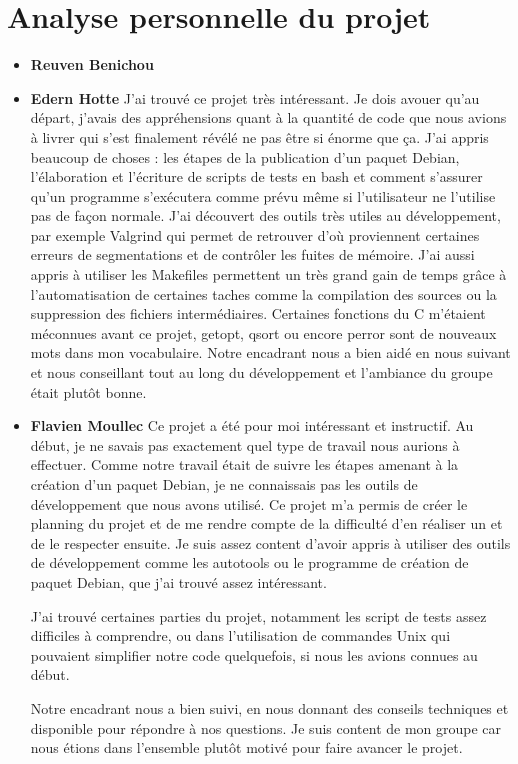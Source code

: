 \chapter{Analyse personnelle du projet}

\begin{itemize}
\item [\textbullet] \Large \textbf{Reuven Benichou}
\newline
\normalsize
\item [\textbullet] \Large \textbf{Edern Hotte}
\newline
\normalsize
J'ai trouv\'e ce projet tr\`es int\'eressant. Je dois avouer qu'au d\'epart, j'avais des appr\'ehensions quant \`a la quantit\'e de code que nous avions \`a livrer qui s'est finalement 
r\'ev\'el\'e ne pas \^etre si \'enorme que \c ca. J'ai appris beaucoup de choses : les \'etapes de la publication d'un paquet Debian, l'\'elaboration et l'\'ecriture de scripts de tests 
en bash et comment s'assurer qu'un programme s'ex\'ecutera comme pr\'evu m\^eme si l'utilisateur ne l'utilise pas de fa\c con normale. J'ai d\'ecouvert des outils tr\`es utiles au d\'eveloppement, par exemple Valgrind qui permet de retrouver
d'o\`u proviennent certaines erreurs de segmentations et de contr\^oler les fuites de m\'emoire. J'ai aussi appris \`a utiliser les Makefiles permettent un tr\`es grand gain
de temps gr\^ace \`a l'automatisation de certaines taches comme la compilation des sources ou la suppression des fichiers interm\'ediaires. Certaines fonctions du C m'\'etaient m\'econnues avant ce projet,
getopt, qsort ou encore perror sont de nouveaux mots dans mon vocabulaire. Notre encadrant nous a bien aid\'e en nous suivant et nous conseillant tout au long du d\'eveloppement et l'ambiance du groupe \'etait plut\^ot bonne.\newline
\item [\textbullet] \Large \textbf{Flavien Moullec}
\newline
\normalsize
Ce projet a \'et\'e pour moi int\'eressant et instructif. Au d\'ebut, je ne savais pas exactement quel type de travail nous aurions \`a effectuer.
Comme notre travail \'etait de suivre les \'etapes amenant \`a la cr\'eation d'un paquet Debian, je ne connaissais pas les outils de
d\'eveloppement que nous avons utilis\'e. Ce projet m'a permis de cr\'eer le planning du projet et de me rendre compte de la difficult\'e d'en r\'ealiser un
et de le respecter ensuite. Je suis assez content d'avoir appris \`a utiliser des outils de d\'eveloppement comme les autotools ou le programme de cr\'eation de 
paquet Debian, que j'ai trouv\'e assez int\'eressant.

J'ai trouv\'e certaines parties du projet, notamment les script de tests assez difficiles \`a comprendre, ou dans l'utilisation de commandes Unix qui pouvaient
simplifier notre code quelquefois, si nous les avions connues au d\'ebut.

Notre encadrant nous a bien suivi, en nous donnant des conseils techniques et disponible pour r\'epondre \`a nos questions.
Je suis content de mon groupe car nous \'etions dans l'ensemble plut\^ot motiv\'e pour faire avancer le projet.


\end{itemize}
